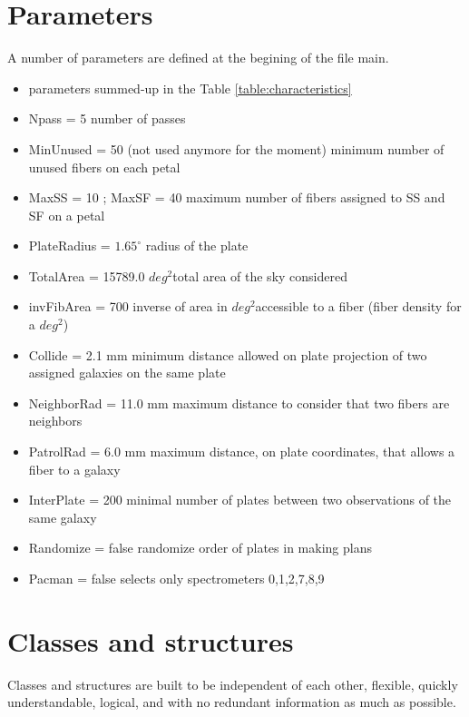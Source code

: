 \documentclass{extarticle}
\def\sqd{$deg^{2}$}
\begin{document}
\section{Parameters}
A number of parameters are defined at the begining of the file main.
\begin{itemize} 
	\item parameters summed-up in the Table \ref{table:characteristics}
	\item Npass = 5 number of passes
	\item MinUnused = 50 (not used anymore for the moment) minimum number of unused fibers on each petal
	\item MaxSS = 10 ; MaxSF = 40 maximum number of fibers assigned to SS and SF on a petal
	\item PlateRadius = $1.65^{\circ}$ radius of the plate
	\item TotalArea = 15789.0 \sqd total area of the sky considered
	\item invFibArea = 700 inverse of area in \sqd accessible to a fiber (fiber density for a \sqd)
	\item Collide = 2.1 mm minimum distance allowed on plate projection of two assigned galaxies on the same plate
	\item NeighborRad = 11.0 mm maximum distance to consider that two fibers are neighbors
	\item PatrolRad = 6.0 mm maximum distance, on plate coordinates, that allows a fiber to a galaxy
	\item InterPlate = 200 minimal number of plates between two observations of the same galaxy
	\item Randomize = false randomize order of plates in making plans
	\item Pacman = false selects only spectrometers 0,1,2,7,8,9
\end{itemize} 


\section{Classes and structures}
Classes and structures are built to be independent of each other, flexible, quickly understandable, logical, and with no redundant information as much as possible.
\end{document}
